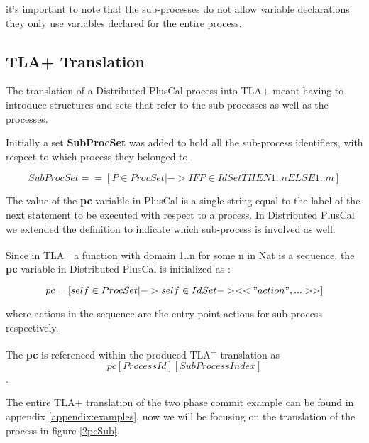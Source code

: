 \documentclass{thesul}
\newcommand{\tlaplus}{TLA\textsuperscript{+}\xspace}
\begin{document}
it's important to note that the sub-processes do not allow variable declarations they only use variables declared for the entire process.

\subsection{TLA+ Translation}

The translation of a Distributed PlusCal process into TLA+ meant having to introduce structures and sets that refer to the sub-processes as well as the processes.

Initially a set \textbf{SubProcSet} was added to hold all the sub-process identifiers, with respect to which process they belonged to.

\[
SubProcSet == [P \in ProcSet |-> IF P \in IdSet  THEN  1..n
								  ELSE  1..m ]
\]						  

The value of the \textbf{pc} variable in PlusCal is a single string equal to the label of the next statement to be executed with respect to a process. In Distributed PlusCal we extended the definition to indicate which sub-process is involved as well.

Since in \tlaplus a function with domain 1..n for some n in Nat is a sequence, the \textbf{pc} variable in Distributed PlusCal is initialized as :

\[
pc = [self \in ProcSet |-> self \in IdSet -> <<"action",...>>]
\]	

where actions in the sequence are the entry point actions for sub-process respectively. 

The \textbf{pc} is referenced within the produced \tlaplus translation as \[ pc[Process Id][SubProcess Index] \].
		  
The entire TLA+ translation of the two phase commit example can be found in appendix \ref{appendix:examples}, now we will be focusing on the translation of the process in figure \ref{2pcSub}.
\end{document}

